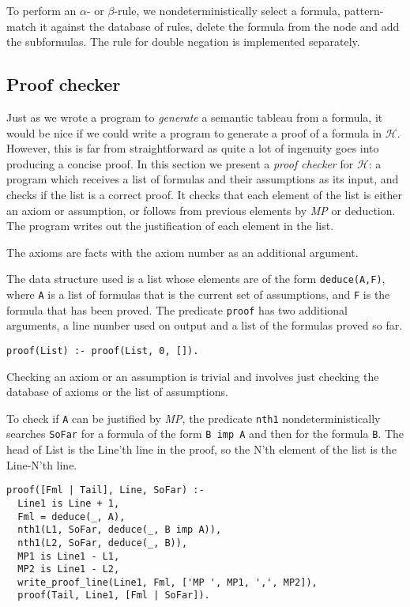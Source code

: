 \documentclass[11pt]{article}
\newcommand*{\p}[1]{\textup{\texttt{#1}}}
\begin{document}
To perform an $\alpha$- or $\beta$-rule, we nondeterministically select
a formula, pattern-match it against the database of rules, delete the
formula from the node and add the subformulas. The rule for double
negation is implemented separately.



\subsection{Proof checker}\label{s.checkprop}

Just as we wrote a program to \emph{generate} a semantic tableau from a
formula, it would be nice if we could write a program to generate a
proof of a formula in $\mathcal{H}$. However, this is far from
straightforward as quite a lot of ingenuity goes into producing a
concise proof. In this section we present a \emph{proof checker}
for $\mathcal{H}$: a program which receives a list of formulas and their
assumptions as its input, and checks if the list is a correct proof. It
checks that each element of the list is either an axiom or assumption,
or follows from previous elements by \emph{MP} or deduction. The program
writes out the justification of each element in the list.
 
The axioms are facts with the axiom number as an additional argument.

The data structure used is a list whose elements are of the form
\p{deduce(A,F)}, where \p{A} is a list of formulas that is the current
set of assumptions, and \p{F} is the formula that has been proved. The
predicate \p{proof} has two additional arguments, a line number used on
output and a list of the formulas proved so far.

\begin{verbatim}
proof(List) :- proof(List, 0, []).
\end{verbatim}

Checking an axiom or an assumption is trivial and involves just checking
the database of axioms or the list of assumptions.

To check if \p{A} can be justified by \emph{MP}, the predicate \p{nth1}
nondeterministically searches \p{SoFar} for a formula of the form \p{B
imp A} and then for the formula \p{B}. The head of List is the Line'th
line in the proof, so the N'th element of the list is the Line-N'th
line.

\begin{verbatim}
proof([Fml | Tail], Line, SoFar) :- 
  Line1 is Line + 1,
  Fml = deduce(_, A),
  nth1(L1, SoFar, deduce(_, B imp A)), 
  nth1(L2, SoFar, deduce(_, B)),
  MP1 is Line1 - L1,
  MP2 is Line1 - L2,
  write_proof_line(Line1, Fml, ['MP ', MP1, ',', MP2]),
  proof(Tail, Line1, [Fml | SoFar]).
\end{verbatim}
\end{document}

